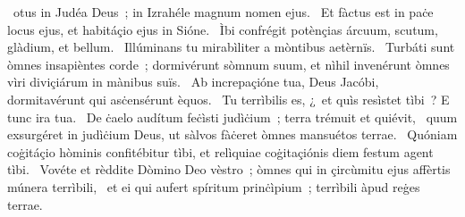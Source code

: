 { }
{%
~otus in Judéa Deus~; in Izrahéle magnum nomen ejus. 
~Et fàctus est in paċe locus ejus, et habitáçio ejus in Sióne. 
~Ìbi confrégit potènçias árcuum, scutum, glàdium, et bellum. 
~Illúminans tu mirabìliter a mòntibus aetèrnïs. 
~Turbáti sunt òmnes insapièntes corde~; dormivérunt sòmnum suum, et nìhil invenérunt òmnes vìri diviçiárum in mànibus suïs. 
~Ab increpaçióne tua, Deus Jacóbi, dormitavérunt qui asċensérunt èquos. 
~Tu terrìbilis es, ¿~et quìs resìstet tìbi~? E tunc ira tua. 
~De ċaelo audítum feċìsti judìċium~; terra trémuit et quiévit, 
~quum exsurgéret in judìċium Deus, ut sàlvos fàċeret òmnes mansuétos terrae. 
~Quóniam coġitáçio hòminis confitébitur tìbi, et relìquiae coġitaçiónis diem festum agent tìbi. 
~Vovéte et rèddite Dòmino Deo vèstro~; òmnes qui in çircùmitu ejus affèrtis múnera terrìbili, 
~et ei qui aufert spíritum prinċìpium~; terrìbili àpud reġes terrae. 
}
